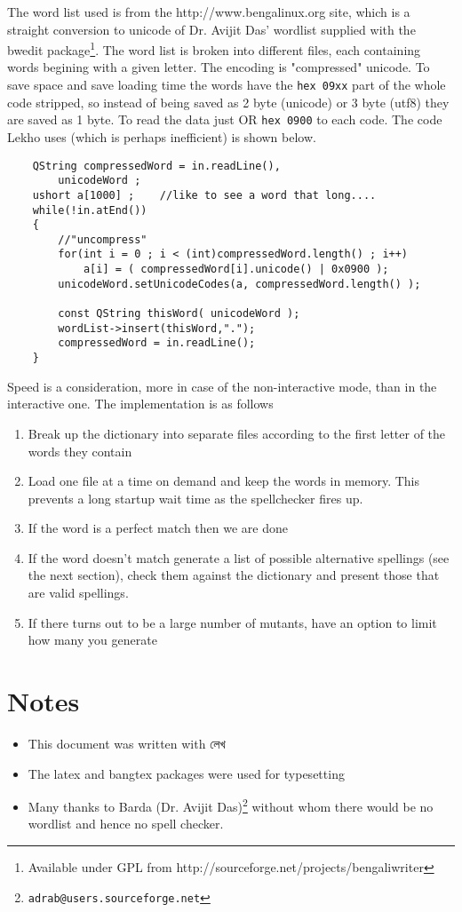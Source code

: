 \documentclass[11pt]{article}
\begin{document}
The word list used is from the http://www.bengalinux.org site, which is a straight conversion to unicode of Dr. Avijit Das' wordlist supplied with the bwedit package\footnote{Available under GPL from http://sourceforge.net/projects/bengaliwriter}. The word list is broken into different files, each containing words begining with a given letter. The encoding is "compressed" unicode. To save space and save loading time the words have the {\tt hex 09xx} part of the whole code stripped, so instead of being saved as 2 byte (unicode) or 3 byte (utf8) they are saved as 1 byte. To read the data just OR {\tt hex 0900} to each code. The code Lekho uses (which is perhaps inefficient) is shown below.
\begin{verbatim}
	QString compressedWord = in.readLine(),
		unicodeWord ;
	ushort a[1000] ;	//like to see a word that long....
	while(!in.atEnd())
	{
		//"uncompress"
		for(int i = 0 ; i < (int)compressedWord.length() ; i++)
			a[i] = ( compressedWord[i].unicode() | 0x0900 );
		unicodeWord.setUnicodeCodes(a, compressedWord.length() );

		const QString thisWord( unicodeWord );
		wordList->insert(thisWord,".");
		compressedWord = in.readLine();
	}
\end{verbatim}


Speed is a consideration, more in case of the non-interactive mode, than in the interactive one. The implementation is as follows

\begin{enumerate}
\item Break up the dictionary into separate files according to the first letter of the words they contain
\item Load one file at a time on demand and keep the words in memory. This prevents a long startup wait time as the spellchecker fires up.
\item If the word is a perfect match then we are done
\item If the word doesn't match generate a list of possible alternative spellings (see the next section), check them against the dictionary and present those that are valid spellings.
\item If there turns out to be  a large number of mutants, have an option to limit how many you generate
\end{enumerate}

\section{Notes}
\begin{itemize}
\item This document was written with {\lbng লেখ} 
\item The latex and bangtex packages were used for typesetting
\item Many thanks to Barda (Dr. Avijit Das)\footnote{{\tt adrab@users.sourceforge.net}} without whom there would be no wordlist and hence no spell checker.
\end{itemize}
\begin{center}
\end{center}
\end{document}

